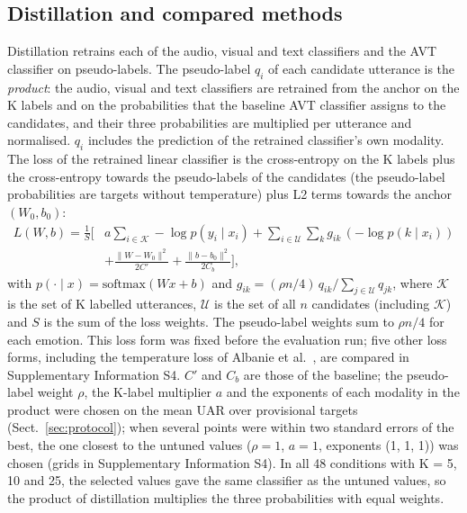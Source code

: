 \subsection{Distillation and compared methods}\label{sec:distill}
Distillation retrains each of the audio, visual and text classifiers and the AVT classifier on pseudo-labels. The pseudo-label $q_i$ of each candidate utterance is the \emph{product}: the audio, visual and text classifiers are retrained from the anchor on the K labels and on the probabilities that the baseline AVT classifier assigns to the candidates, and their three probabilities are multiplied per utterance and normalised. $q_i$ includes the prediction of the retrained classifier's own modality. The loss of the retrained linear classifier is the cross-entropy on the K labels plus the cross-entropy towards the pseudo-labels of the candidates (the pseudo-label probabilities are targets without temperature) plus L2 terms towards the anchor $(W_0,b_0)$:
\begin{equation}
\begin{split}
L(W,b)=\frac{1}{S}\Big[&a\sum_{i\in\mathcal{K}}-\log p(y_i\mid x_i)+\sum_{i\in\mathcal{U}}\sum_k g_{ik}\,(-\log p(k\mid x_i))\\
&+\frac{\|W-W_0\|^2}{2C'}+\frac{\|b-b_0\|^2}{2C_b}\Big],
\end{split}
\end{equation}
with $p(\cdot\mid x)=\mathrm{softmax}(Wx+b)$ and $g_{ik}=(\rho n/4)\,q_{ik}/\sum_{j\in\mathcal{U}}q_{jk}$, where $\mathcal{K}$ is the set of K labelled utterances, $\mathcal{U}$ is the set of all $n$ candidates (including $\mathcal{K}$) and $S$ is the sum of the loss weights. The pseudo-label weights sum to $\rho n/4$ for each emotion. This loss form was fixed before the evaluation run; five other loss forms, including the temperature loss of Albanie et al.\ \cite{hinton2015distilling,albanie2018}, are compared in Supplementary Information S4. $C'$ and $C_b$ are those of the baseline; the pseudo-label weight $\rho$, the K-label multiplier $a$ and the exponents of each modality in the product were chosen on the mean UAR over provisional targets (Sect.~\ref{sec:protocol}); when several points were within two standard errors of the best, the one closest to the untuned values ($\rho=1$, $a=1$, exponents (1, 1, 1)) was chosen (grids in Supplementary Information S4). In all 48 conditions with K = 5, 10 and 25, the selected values gave the same classifier as the untuned values, so the product of distillation multiplies the three probabilities with equal weights.

